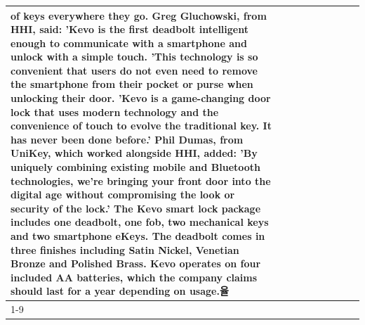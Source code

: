 \begin{table}[H]
\begin{tabular}{lllrlllll}
of keys everywhere they go. Greg Gluchowski, from HHI, said: 'Kevo is the first deadbolt intelligent enough to communicate with a smartphone and unlock with a simple touch. 'This technology is so convenient that users do not even need to remove the smartphone from their pocket or purse when unlocking their door. 'Kevo is a game-changing door lock that uses modern technology and the convenience of touch to evolve the traditional key. It has never been done before.' Phil Dumas, from UniKey, which worked alongside HHI, added: 'By uniquely combining existing mobile and Bluetooth technologies, we’re bringing your front door into the digital age without compromising the look or security of the lock.' The Kevo smart lock package includes one deadbolt, one fob, two mechanical keys and two smartphone eKeys. The deadbolt comes in three finishes including Satin Nickel, Venetian Bronze and Polished Brass. Kevo operates on four included AA batteries, which the company claims should last for a year depending on usage.율 \\
\cline{1-9}

\end{tabular}
\end{table}
